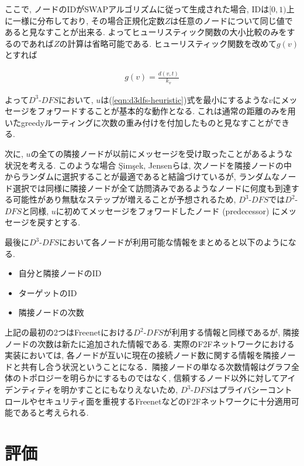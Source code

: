 \documentclass[technicalreport]{./ieicej-v3.0/UTF/ieicej}
\begin{document}
ここで, ノードのIDがSWAPアルゴリズムに従って生成された場合, IDは$[0,1)$上に一様に分布しており, その場合正規化定数$Z$は任意のノードについて同じ値であると見なすことが出来る. よってヒューリスティック関数の大小比較のみをするのであれば$Z$の計算は省略可能である. ヒューリスティック関数を改めて$g(v)$とすれば

\begin{eqnarray}
g(v) = \frac{d(v,t)}{k_v} \label{eqn:d3dfs-heuristic}
\end{eqnarray}

よって$D^3$-$DFS$において, $u$は(\ref{eqn:d3dfs-heuristic})式を最小にするような$v$にメッセージをフォワードすることが基本的な動作となる. これは通常の距離のみを用いたgreedyルーティングに次数の重み付けを付加したものと見なすことができる.

次に, $u$の全ての隣接ノードが以前にメッセージを受け取ったことがあるような状況を考える. このような場合 {\c{S}}im{\c{s}}ek, Jensenらは, 次ノードを隣接ノードの中からランダムに選択することが最適であると結論づけているが, ランダムなノード選択では同様に隣接ノードが全て訪問済みであるようなノードに何度も到達する可能性があり無駄なステップが増えることが予想されるため, $D^3$-$DFS$では$D^2$-$DFS$と同様, $u$に初めてメッセージをフォワードしたノード (predecessor) にメッセージを戻すとする.

最後に$D^3$-$DFS$において各ノードが利用可能な情報をまとめると以下のようになる.

   \begin{itemize}
    \item 自分と隣接ノードのID

    \item ターゲットのID

    \item 隣接ノードの次数
   \end{itemize}

上記の最初の2つはFreenetにおける$D^2$-$DFS$が利用する情報と同様であるが, 隣接ノードの次数は新たに追加された情報である. 実際のF2Fネットワークにおける実装においては, 各ノードが互いに現在の接続ノード数に関する情報を隣接ノードと共有し合う状況ということになる．隣接ノードの単なる次数情報はグラフ全体のトポロジーを明らかにするものではなく, 信頼するノード以外に対してアイデンティティを明かすことにもなりえないため, $D^3$-$DFS$はプライバシーコントロールやセキュリティ面を重視するFreenetなどのF2Fネットワークに十分適用可能であると考えられる.

 \section{評価} \label{sec:evaluation}
\end{document}
